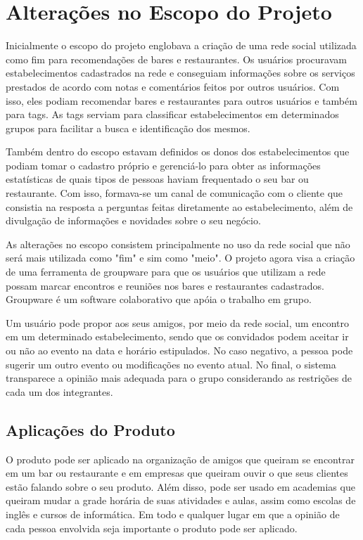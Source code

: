 \section{Alterações no Escopo do Projeto}

    Inicialmente o escopo do projeto englobava a criação de uma rede social utilizada como fim para recomendações de bares e restaurantes. Os usuários procuravam estabelecimentos cadastrados na rede e conseguiam informações sobre os serviços prestados de acordo com notas e comentários feitos por outros usuários. Com isso, eles podiam recomendar bares e restaurantes para outros usuários e também para tags. As tags serviam para classificar estabelecimentos em determinados grupos para facilitar a busca e identificação dos mesmos.
 
    Também dentro do escopo estavam definidos os donos dos estabelecimentos que podiam tomar o cadastro próprio e gerenciá-lo para obter as informações estatísticas de quais tipos de pessoas haviam frequentado o seu bar ou restaurante. Com isso, formava-se um canal de comunicação com o cliente que consistia na resposta a perguntas feitas diretamente ao estabelecimento, além de divulgação de informações e novidades sobre o seu negócio.
 
    As alterações no escopo consistem principalmente no uso da rede social que não será mais utilizada como "fim" e sim como "meio". O projeto agora visa a criação de uma ferramenta de groupware para que os usuários que utilizam a rede possam marcar encontros e reuniões nos bares e restaurantes cadastrados. Groupware é um software colaborativo que apóia o trabalho em grupo.

    Um usuário pode propor aos seus amigos, por meio da rede social, um encontro em um determinado estabelecimento, sendo que os convidados podem aceitar ir ou não ao evento na data e horário estipulados. No caso negativo, a pessoa pode sugerir um outro evento ou modificações no evento atual. No final, o sistema transparece a opinião mais adequada para o grupo considerando as restrições de cada um dos integrantes.
 
\subsection{Aplicações do Produto}

    O produto pode ser aplicado na organização de amigos que queiram se encontrar em um bar ou restaurante e em empresas que queiram ouvir o que seus clientes estão falando sobre o seu produto. Além disso, pode ser usado em academias que queiram mudar a grade horária de suas atividades e aulas, assim como escolas de inglês e cursos de informática. Em todo e qualquer lugar em que a opinião de cada pessoa envolvida seja importante o produto pode ser aplicado. 

